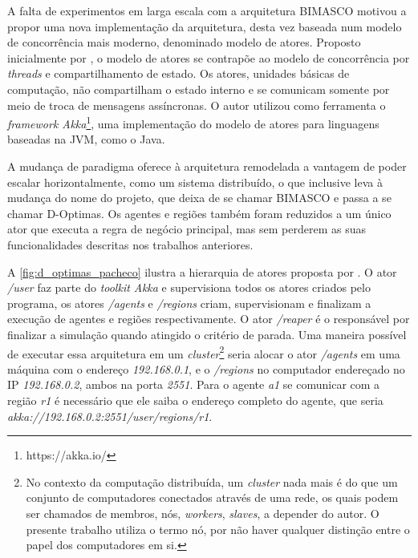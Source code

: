 A falta de experimentos em larga escala com a arquitetura BIMASCO motivou  a propor uma nova implementação da arquitetura, desta vez baseada num modelo de concorrência mais moderno, denominado modelo de atores. Proposto inicialmente por , o modelo de atores se contrapõe ao modelo de concorrência por \textit{threads} e compartilhamento de estado. Os atores, unidades básicas de computação, não compartilham o estado interno e se comunicam somente por meio de troca de mensagens assíncronas. O autor utilizou como ferramenta o \textit{framework Akka}\footnote{https://akka.io/}, uma implementação do modelo de atores para linguagens baseadas na JVM, como o Java. 

A mudança de paradigma oferece à arquitetura remodelada a vantagem de poder escalar horizontalmente, como um sistema distribuído, o que inclusive leva à mudança do nome do projeto, que deixa de se chamar BIMASCO e passa a se chamar D-Optimas. Os agentes e regiões também foram reduzidos a um único ator que executa a regra de negócio principal, mas sem perderem as suas funcionalidades descritas nos trabalhos anteriores. 

A \autoref{fig:d_optimas_pacheco} ilustra a hierarquia de atores proposta por . O ator \textit{/user} faz parte do \textit{toolkit Akka} e supervisiona todos os atores criados pelo programa, os atores \textit{/agents} e \textit{/regions} criam, supervisionam e finalizam a execução de agentes e regiões respectivamente. O ator \textit{/reaper} é o responsável por finalizar a simulação quando atingido o critério de parada. Uma maneira possível de executar essa arquitetura em um \textit{cluster}\footnote{No contexto da computação distribuída, um \textit{cluster} nada mais é do que um conjunto de computadores conectados através de uma rede, os quais podem ser chamados de membros, nós, \textit{workers}, \textit{slaves}, a depender do autor. O presente trabalho utiliza o termo nó, por não haver qualquer distinção entre o papel dos computadores em si. } seria alocar o ator \textit{/agents} em uma máquina com o endereço \textit{192.168.0.1}, e o \textit{/regions} no computador endereçado no IP \textit{192.168.0.2}, ambos na porta \textit{2551}. Para o agente \textit{a1} se comunicar com a região \textit{r1} é necessário que ele saiba o endereço completo do agente, que seria \textit{akka://192.168.0.2:2551/user/regions/r1}.

